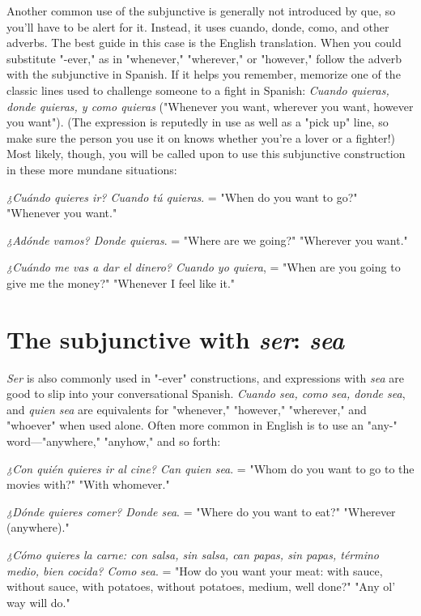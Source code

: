 \documentclass[14pt,a4paper,oneside]{memoir}
\newcommand{\bsk}{\vspace{20pt}}
\newcommand{\indu}{\hspace{20pt}}
\begin{document}
Another common use of the subjunctive is generally not introduced by que, so you'll have to be alert for it. Instead, it uses cuando,
donde, como, and other adverbs. The best guide in this case is the English translation. When you could substitute "-ever," as in "whenever," "wherever," or "however," follow the adverb with the subjunctive
in Spanish. If it helps you remember, memorize one of the classic
lines used to challenge someone to a fight in Spanish: \emph{Cuando quieras,
donde quieras, y como quieras} ("Whenever you want, wherever you
want, however you want"). (The expression is reputedly in use as well
as a "pick up" line, so make sure the person you use it on knows
whether you're a lover or a fighter!) Most likely, though, you will be
called upon to use this subjunctive construction in these more mundane situations:

\bsk

\indu \emph{¿Cuándo quieres ir? Cuando tú quieras}. = "When do you
want to go?" "Whenever you want."

\indu \emph{¿Adónde vamos? Donde quieras}. = "Where are we going?"
"Wherever you want."

\indu \emph{¿Cuándo me vas a dar el dinero? Cuando yo quiera}, = "When
are you going to give me the money?" "Whenever I
feel like it."

\section{The subjunctive with \emph{ser}: \emph{sea}}

\emph{Ser} is also commonly used in "-ever" constructions, and expressions with \emph{sea} are good to slip into your conversational Spanish.
\emph{Cuando sea, como sea, donde sea}, and \emph{quien sea} are equivalents for
"whenever," "however," "wherever," and "whoever" when used alone.
Often more common in English is to use an "any-" word---"anywhere," "anyhow," and so forth:

\bsk

\indu \emph{¿Con quién quieres ir al cine? Can quien sea}. = "Whom
do you want to go to the movies with?" "With
whomever."

\indu \emph{¿Dónde quieres comer? Donde sea}. = "Where do you want to
eat?" "Wherever (anywhere)."

\indu \emph{¿Cómo quieres la carne: con salsa, sin salsa, can papas, sin
papas, término medio, bien cocida? Como sea}. =
"How do you want your meat: with sauce, without
sauce, with potatoes, without potatoes, medium, well
done?" "Any ol' way will do."
\end{document}
